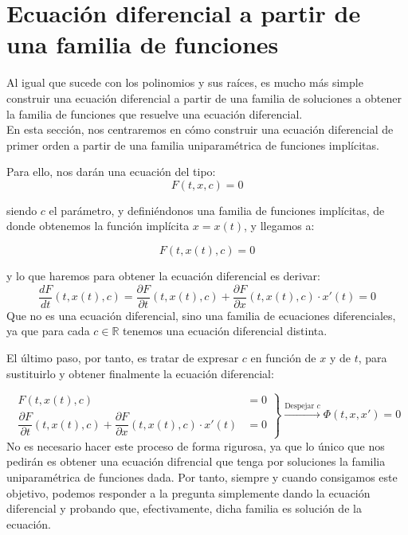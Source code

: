 \section{Ecuación diferencial a partir de una familia de funciones}\label{sec:1.4}
Al igual que sucede con los polinomios y sus raíces, es mucho más simple construir una ecuación diferencial a partir de una familia de soluciones a obtener la familia de funciones que resuelve una ecuación diferencial.\\

En esta sección, nos centraremos en cómo construir una ecuación diferencial de primer orden a partir de una familia uniparamétrica de funciones implícitas.

Para ello, nos darán una ecuación del tipo:
\begin{equation*}
    F(t,x,c) = 0
\end{equation*}

siendo $c$ el parámetro, y definiéndonos una familia de funciones implícitas, de donde obtenemos la función implícita $x=x(t)$, y llegamos a:

\begin{equation*}
    F(t,x(t),c) = 0
\end{equation*}

y lo que haremos para obtener la ecuación diferencial es derivar:
\begin{equation*}
    \dfrac{dF}{dt}(t,x(t),c) = \dfrac{\partial F}{\partial t}(t,x(t),c) + \dfrac{\partial F}{\partial x}(t,x(t),c)\cdot x'(t) = 0
\end{equation*}
Que no es una ecuación diferencial, sino una familia de ecuaciones diferenciales, ya que para cada $c\in \mathbb{R}$ tenemos una ecuación diferencial distinta.

El último paso, por tanto, es tratar de expresar $c$ en función de $x$ y de $t$, para sustituirlo y obtener finalmente la ecuación diferencial:

\begin{equation*}
    \left.\begin{array}{rr}
                F(t,x(t),c) &= 0 \\
                \dfrac{\partial F}{\partial t}(t,x(t),c) + \dfrac{\partial F}{\partial x}(t,x(t),c)\cdot x'(t) &= 0
        \end{array}\right\} \overset{\text{Despejar $c$}}{\longrightarrow } \Phi(t,x,x') = 0
\end{equation*}
No es necesario hacer este proceso de forma rigurosa, ya que lo único que nos pedirán es obtener una ecuación difrencial que tenga por soluciones la familia uniparamétrica de funciones dada. Por tanto, siempre y cuando consigamos este objetivo, podemos responder a la pregunta simplemente dando la ecuación diferencial y probando que, efectivamente, dicha familia es solución de la ecuación.

